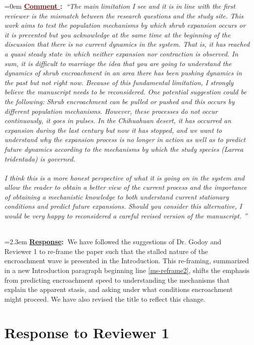 \documentclass[12pt]{article}
\newcounter{cN}
\newcommand{\comment}[1]{
	\vspace{2em}
	\refstepcounter{cN} %
	\noindent \hangindent=0em \textbf{\textcolor{Maroon}{\uline{Comment \thecN}:~}}\emph{``#1''}
	}
\newcommand{\response}[1]{
	\\[0.25em]
	\hangindent=2.3em \textbf{\textcolor{NavyBlue}{\uline{Response}:~}}#1
	}
\begin{document}
\comment{The main limitation I see and it is in line with the first reviewer is the mismatch between the research questions and the study site. This work aims to test the population mechanisms by which shrub expansion occurs or it is prevented but you acknowledge at the same time at the beginning of the discussion that there is no current dynamics in the system. That is, it has reached a quasi steady state in which neither expansion nor contraction is observed. In sum, it is difficult to marriage the idea that you are going to understand the dynamics of shrub encroachment in an area there has been pushing dynamics in the past but not right now. Because of this fundamental limitation, I strongly believe the manuscript needs to be reconsidered. One potential suggestion could be the following: Shrub encroachment can be pulled or pushed and this occurs by different population mechanisms. However, these processes do not occur continuously, it goes in pulses. In the Chihuahuan desert, it has occurred an expansion during the last century but now it has stopped, and we want to understand why the expansion process is no longer in action as well as to predict future dynamics according to the mechanisms by which the study species (Larrea tridentada) is governed. 
\\
\\
I think this is a more honest perspective of what it is going on in the system and allow the reader to obtain a better view of the current process and the importance of obtaining a mechanistic knowledge to both understand current stationary conditions and predict future expansions. Should you consider this alternative, I would be very happy to reconsidered a careful revised version of the manuscript.  
}
\response{We have followed the suggestions of Dr. Godoy and Reviewer 1 to re-frame the paper such that the stalled nature of the encroachment wave is presented in the Introduction. This re-framing, summarized in a new Introduction paragraph beginning line \ref{ms-reframe2}, shifts the emphasis from predicting encroachment speed to understanding the mechanisms that explain the apparent stasis, and asking under what conditions encroachment might proceed. We have also revised the title to reflect this change.}

\section{Response to Reviewer 1}
\vspace{-2em}
\end{document}
